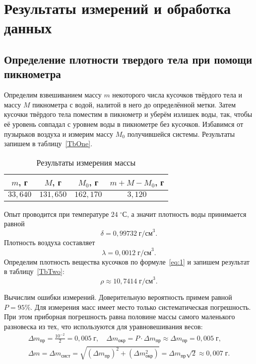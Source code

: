 \section{Результаты измерений и обработка данных}

\subsection{Определение плотности твердого тела при помощи пикнометра}
Определим взвешиванием массу $m$ некоторого числа кусочков твёрдого тела и массу $M$ пикнометра с водой, налитой в него до определённой метки. Затем кусочки твёрдого тела поместим в пикнометр и уберём излишек воды, так, чтобы её уровень совпадал с уровнем воды в пикнометре без кусочков. Избавимся от пузырьков воздуха и измерим массу $M_0$ получившейся системы. Результаты запишем в таблицу~\eqref{TbOne}.

\begin{table}[h!]
	\begin{center}
	\begin{tabular}{|c|c|c|c|}
		\hline
		$m$, г & $M$, г & $M_0$, г & $m+M-M_0$, г \\
		\hline
		$33{,}640$ & $131{,}650$ & $162{,}170$ & $3{,}120$ \\
		\hline
	\end{tabular}
	\caption{Результаты измерения массы}\label{TbOne}
	\end{center}
\end{table}

Опыт проводится при температуре $24\;^\circ\text{С}$, а значит плотность воды принимается равной
\[
\delta=0{,}99732\;\text{г/см}^3.
\]
Плотность воздуха составляет
\[
\lambda=0{,}0012\;\text{г/см}^3.
\]
Определим плотность вещества кусочков по формуле~\eqref{eq:1} и запишем результат в таблицу~\ref{TbTwo}:
\[
\rho\approx10{,}7414\;\text{г/см}^3.
\]

Вычислим ошибки измерений. Доверительную вероятность примем равной $P=95\%$. Для измерения масс имеет место только систематическая погрешность. При этом приборная погрешность равна половине массы самого маленького разновеска из тех, что используются для уравновешивания весов:
\begin{gather*}
\Delta m_\text{пр}=\frac{10^{-2}}{2}=0{,}005\;\text{г},\quad\Delta m_\text{окр}=P\cdot\Delta m_\text{пр}\approx\Delta m_\text{пр}=0{,}005\;\text{г}, \\
\Delta m=\Delta m_\text{сист}=\sqrt{(\Delta m_\text{пр})^2+(\Delta m_\text{окр}^2)}=\Delta m_\text{пр}\sqrt{2}\approx0{,}007\;\text{г}.
\end{gather*}

